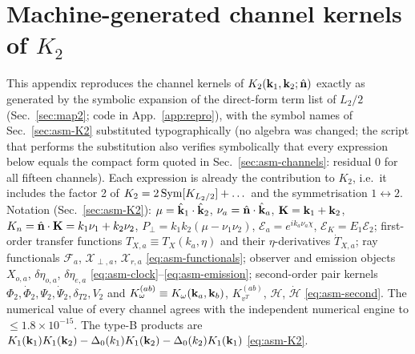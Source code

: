 \section{Machine-generated channel kernels of \texorpdfstring{$K_2$}{K2}}
\label{app:k2channels}
{\sloppy
This appendix reproduces the channel kernels of $K_2(\mathbf k_1,\mathbf k_2;\hat{\mathbf n})$ exactly as generated by the symbolic expansion of the
direct-form term list of $L_2/2$ (Sec.~\ref{sec:map2}; code in App.~\ref{app:repro}), with the symbol names of
Sec.~\ref{sec:asm-K2} substituted typographically (no algebra was changed; the script that performs the substitution
also verifies symbolically that every expression below equals the compact form quoted in
Sec.~\ref{sec:asm-channels}: residual $0$ for all fifteen channels).  Each expression is already the contribution to $K_2$,
i.e.\ it includes the factor 2 of $K_2=2\,{\rm Sym}[K_{L_2/2}]+\dots$ and the symmetrisation $1\leftrightarrow2$.
Notation (Sec.~\ref{sec:asm-K2}): $\mu=\hat{\mathbf k}_1\cdot\hat{\mathbf k}_2$, $\nu_a=\hat{\mathbf n}\cdot\hat{\mathbf k}_a$, $\mathbf K=\mathbf k_1+\mathbf k_2$, $K_n=\hat{\mathbf n}\cdot\mathbf K=k_1\nu_1+k_2\nu_2$,
$P_\perp=k_1k_2(\mu-\nu_1\nu_2)$, $\mathcal E_a=e^{ik_a\nu_a\chi}$, $\mathcal E_K=E_1\mathcal E_2$; first-order transfer functions $T_{X,a}\equiv T_X(k_a,\eta)$ and
their $\eta$-derivatives $\dot T_{X,a}$; ray functionals $\mathcal F_a$, $\mathcal X_{\perp,a}$, $\mathcal X_{r,a}$ \eqref{eq:asm-functionals};
observer and emission objects $X_{o,a}$, $\delta\eta_{o,a}$, $\delta\eta_{e,a}$ \eqref{eq:asm-clock}--\eqref{eq:asm-emission};
second-order pair kernels $\Phi_2,\dot\Phi_2,\Psi_2,\dot\Psi_2,\delta_{T2},V_2$ and $K^{(ab)}_{\omega}\equiv K_\omega(\mathbf k_a,\mathbf k_b)$,
$K^{(ab)}_{v^T}$, $\mathcal H$, $\dot{\mathcal H}$ \eqref{eq:asm-second}.  The numerical value of every channel agrees with the
independent numerical engine to $\le1.8\times10^{-15}$.
The type-B products are $K_1(\mathbf k_1)K_1(\mathbf k_2)-\Delta_0(k_1)K_1(\mathbf k_2)-\Delta_0(k_2)K_1(\mathbf k_1)$ \eqref{eq:asm-K2}.\par}

